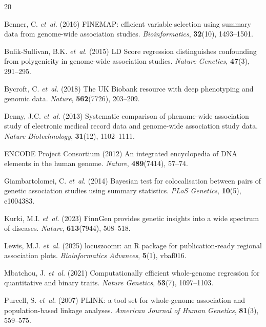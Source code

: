 \documentclass{bioinfo}
\begin{document}
\begin{thebibliography}{20}

Benner, C. {\it et~al.} (2016) FINEMAP: efficient variable selection using summary data from genome-wide association studies. \textit{Bioinformatics}, \textbf{32}(10), 1493--1501.

Bulik-Sullivan, B.K. {\it et~al.} (2015) LD Score regression distinguishes confounding from polygenicity in genome-wide association studies. \textit{Nature Genetics}, \textbf{47}(3), 291--295.

Bycroft, C. {\it et~al.} (2018) The UK Biobank resource with deep phenotyping and genomic data. \textit{Nature}, \textbf{562}(7726), 203--209.

Denny, J.C. {\it et~al.} (2013) Systematic comparison of phenome-wide association study of electronic medical record data and genome-wide association study data. \textit{Nature Biotechnology}, \textbf{31}(12), 1102--1111.

{ENCODE Project Consortium} (2012) An integrated encyclopedia of DNA elements in the human genome. \textit{Nature}, \textbf{489}(7414), 57--74.

Giambartolomei, C. {\it et~al.} (2014) Bayesian test for colocalisation between pairs of genetic association studies using summary statistics. \textit{PLoS Genetics}, \textbf{10}(5), e1004383.

Kurki, M.I. {\it et~al.} (2023) FinnGen provides genetic insights into a wide spectrum of diseases. \textit{Nature}, \textbf{613}(7944), 508--518.

Lewis, M.J. {\it et~al.} (2025) locuszoomr: an R package for publication-ready regional association plots. \textit{Bioinformatics Advances}, \textbf{5}(1), vbaf016.

Mbatchou, J. {\it et~al.} (2021) Computationally efficient whole-genome regression for quantitative and binary traits. \textit{Nature Genetics}, \textbf{53}(7), 1097--1103.

Purcell, S. {\it et~al.} (2007) PLINK: a tool set for whole-genome association and population-based linkage analyses. \textit{American Journal of Human Genetics}, \textbf{81}(3), 559--575.


\end{thebibliography}
\end{document}

